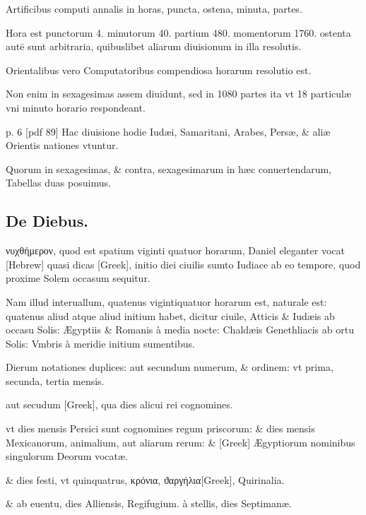 Artificibus
computi annalis in
horas, puncta, ostena, minuta,
partes.

Hora est punctorum
4. minutorum 40.
partium 480. momentorum
1760. ostenta autē sunt arbitraria,
quibuslibet aliarum
diuisionum in illa resolutis.

Orientalibus vero Computatoribus
compendiosa horarum
resolutio est.

Non
enim in sexagesimas assem
diuidunt, sed in 1080 partes
ita vt 18 particulæ vni minuto
horario respondeant.

%

p. 6 [pdf 89]
%
Hac diuisione hodie Iudæi,
Samaritani, Arabes, Persæ,
\& aliæ Orientis nationes vtuntur.

Quorum in sexagesimas, \&
contra, sexagesimarum in hæc conuertendarum, Tabellas duas posuimus.



\subsection{De Diebus.}
\setcounter{parcount}{0}


\textgreek{νυχθήμερον},
quod est spatium viginti quatuor horarum, Daniel
eleganter vocat \texthebrew{[Hebrew]} quasi dicas
\textgreek{[Greek]}, initio diei ciuilis
sumto Iudiace ab eo tempore, quod proxime Solem occasum
sequitur.

Nam illud interuallum, quatenus vigintiquatuor horarum est,
naturale est: quatenus aliud atque aliud initium habet, dicitur ciuile,
Atticis \& Iudæis ab occasu Solis: Ægyptiis \& Romanis à media nocte:
Chaldæis Genethliacis ab ortu Solis: Vmbris à meridie initium
 sumentibus.

Dierum notationes duplices: aut secundum numerum, \&
ordinem: vt prima, secunda, tertia mensis.

aut secudum \textgreek{[Greek]},
qua dies alicui rei cognomines.

vt dies mensis Persici sunt cognomines
regum priscorum: \& dies mensis Mexicanorum, animalium, aut aliarum
rerum: \& \textgreek{[Greek]} Ægyptiorum nominibus singulorum Deorum
vocatæ.

\& dies festi, vt quinquatrus, \textgreek{κρόνια},
\textgreek{ϑαργήλια[Greek]}, Quirinalia.

\& ab euentu, dies Alliensis, Regifugium. à stellis, dies Septimanæ.

